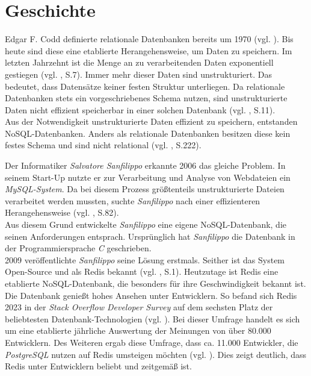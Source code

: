 
\section{Geschichte}
\label{Geschichte}
Edgar F. Codd definierte relationale Datenbanken bereits um 1970 (vgl. \cite{codd}). Bis heute sind diese eine etablierte Herangehensweise, um Daten zu speichern. Im letzten Jahrzehnt ist die Menge an zu verarbeitenden Daten exponentiell gestiegen (vgl. \cite{nosql}, S.7). Immer mehr dieser Daten sind unstrukturiert. Das bedeutet, dass Datensätze keiner festen Struktur unterliegen. Da relationale Datenbanken stets ein vorgeschriebenes Schema nutzen, sind unstrukturierte Daten nicht effizient speicherbar in einer solchen Datenbank (vgl. \cite{1}, S.11). 
\\Aus der Notwendigkeit unstrukturierte Daten effizient zu speichern, entstanden \ac{NoSQL}-Datenbanken. Anders als relationale Datenbanken besitzen diese kein festes Schema und sind nicht relational (vgl. \cite{1}, S.222).

Der Informatiker \textit{Salvatore Sanfilippo} erkannte 2006 das gleiche Problem. In seinem Start-Up nutzte er zur Verarbeitung und Analyse von Webdateien ein\textit{ MySQL-System}. Da bei diesem Prozess größtenteils unstrukturierte Dateien verarbeitet werden mussten, suchte \textit{Sanfilippo} nach einer effizienteren Herangehensweise (vgl. \cite{nosql}, S.82).
\\Aus diesem Grund entwickelte \textit{Sanfilippo} eine eigene \acs{NoSQL}-Datenbank, die seinen Anforderungen entsprach. Ursprünglich hat \textit{Sanfilippo} die Datenbank in der Programmiersprache \textit{C} geschrieben.
\\2009 veröffentlichte \textit{Sanfilippo} seine Lösung erstmals. Seither ist das System Open-Source und als \acs{Redis} bekannt (vgl. \cite{learningRedis}, S.1). Heutzutage ist \acs{Redis} eine etablierte \acs{NoSQL}-Datenbank, die besonders für ihre Geschwindigkeit bekannt ist. Die Datenbank genießt hohes Ansehen unter Entwicklern. So befand sich \acs{Redis} 2023 in der \textit{Stack Overflow Developer Survey} auf dem sechsten Platz der beliebtesten Datenbank-Technologien (vgl. \cite{stackOver}). Bei dieser Umfrage handelt es sich um eine etablierte jährliche Auswertung der Meinungen von über 80.000 Entwicklern. Des Weiteren ergab diese Umfrage, dass ca. 11.000 Entwickler, die \textit{PostgreSQL} nutzen auf \acs{Redis} umsteigen möchten (vgl. \cite{stackOver}). Dies zeigt deutlich, dass \acs{Redis} unter Entwicklern beliebt und zeitgemäß ist. 